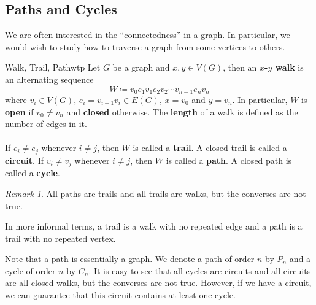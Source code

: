 \documentclass[math, code]{amznotes}
\theoremstyle{remark}
\newtheorem*{remark}{Remark}
\begin{document}
\subsection{Paths and Cycles}
We are often interested in the ``connectedness'' in a graph. In particular, we would wish to study how to traverse a graph from some vertices to others.
\begin{dfnbox}{Walk, Trail, Path}{wtp}
    Let $G$ be a graph and $x, y \in V(G)$, then an {\color{red} \textbf{$x$-$y$ walk}} is an alternating sequence
    \begin{equation*}
        W \coloneqq v_0e_1v_1e_2v_2\cdots v_{n - 1}e_nv_n
    \end{equation*}
    where $v_i \in V(G)$, $e_i = v_{i - 1}v_i \in E(G)$, $x = v_0$ and $y = v_n$. In particular, $W$ is {\color{red} \textbf{open}} if $v_0 \neq v_n$ and {\color{red} \textbf{closed}} otherwise. The {\color{red} \textbf{length}} of a walk is defined as the number of edges in it.
    \\\\
    If $e_i \neq e_j$ whenever $i \neq j$, then $W$ is called a {\color{red} \textbf{trail}}. A closed trail is called a {\color{red} \textbf{circuit}}. If $v_i \neq v_j$ whenever $i \neq j$, then $W$ is called a {\color{red} \textbf{path}}. A closed path is called a {\color{red} \textbf{cycle}}.
\end{dfnbox}
\begin{notebox}
    \begin{remark}
        All paths are trails and all trails are walks, but the converses are not true.
    \end{remark}
\end{notebox}
In more informal terms, a trail is a walk with no repeated edge and a path is a trail with no repeated vertex.

Note that a path is essentially a graph. We denote a path of order $n$ by $P_n$ and a cycle of order $n$ by $C_n$. It is easy to see that all cycles are circuits and all circuits are all closed walks, but the converses are not true. However, if we have a circuit, we can guarantee that this circuit contains at least one cycle.
\end{document}
